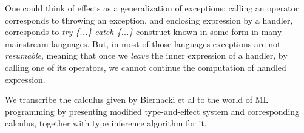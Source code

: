 \documentclass[declaration,shortabstract]{iithesis}
\theoremstyle{definition} \newtheorem{definition}{Definition}[section]
\begin{document}
One could think of effects as a generalization of exceptions:
calling an operator corresponds to throwing an exception,
and enclosing expression by a handler, corresponds to \textit{try \{...\} catch \{...\}}
construct known in some form in many mainstream languages.
But, in most of those languages exceptions are not \textit{resumable},
meaning that once we \textit{leave} the inner expression of a handler,
by calling one of its operators, we cannot continue the computation of
handled expression. 

We transcribe the calculus given by Biernacki et al to the world of ML programming
by presenting modified type-and-effect system and corresponding calculus,
together with type inference algorithm for it.

\end{document}
